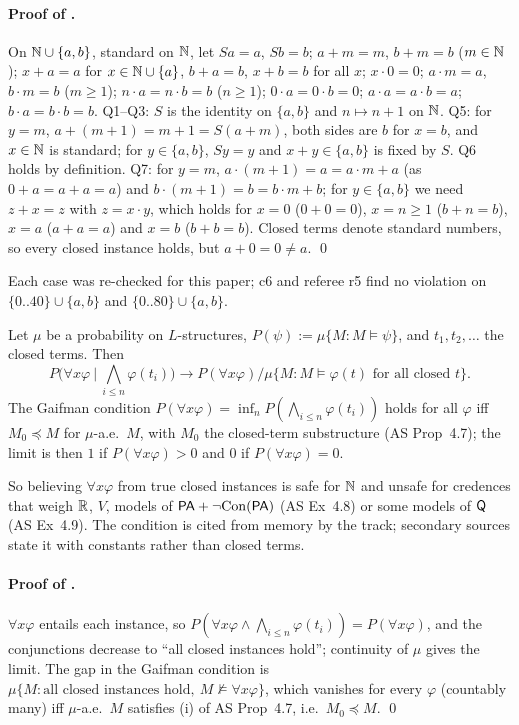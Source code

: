 \paragraph{Proof of .} On $\mathbb{N}\cup\{a,b\}$, standard on $\mathbb{N}$, let $Sa=a$, $Sb=b$; $a+m=m$, $b+m=b$ ($m\in\mathbb{N}$); $x+a=a$ for $x\in\mathbb{N}\cup\{a\}$, $b+a=b$, $x+b=b$ for all $x$; $x\cdot0=0$; $a\cdot m=a$, $b\cdot m=b$ ($m\ge1$); $n\cdot a=n\cdot b=b$ ($n\ge1$); $0\cdot a=0\cdot b=0$; $a\cdot a=a\cdot b=a$; $b\cdot a=b\cdot b=b$. Q1--Q3: $S$ is the identity on $\{a,b\}$ and $n\mapsto n+1$ on $\mathbb{N}$. Q5: for $y=m$, $a+(m+1)=m+1=S(a+m)$, both sides are $b$ for $x=b$, and $x\in\mathbb{N}$ is standard; for $y\in\{a,b\}$, $Sy=y$ and $x+y\in\{a,b\}$ is fixed by $S$. Q6 holds by definition. Q7: for $y=m$, $a\cdot(m+1)=a=a\cdot m+a$ (as $0+a=a+a=a$) and $b\cdot(m+1)=b=b\cdot m+b$; for $y\in\{a,b\}$ we need $z+x=z$ with $z=x\cdot y$, which holds for $x=0$ ($0+0=0$), $x=n\ge1$ ($b+n=b$), $x=a$ ($a+a=a$) and $x=b$ ($b+b=b$). Closed terms denote standard numbers, so every closed instance holds, but $a+0=0\neq a$. \qed

Each case was re-checked for this paper; c6 and referee r5 find no violation on $\{0..40\}\cup\{a,b\}$ and $\{0..80\}\cup\{a,b\}$.

\begin{proposition}\label{prop:univ:gaifman}
Let $\mu$ be a probability on $L$-structures, $P(\psi):=\mu\{M:M\models\psi\}$, and $t_1,t_2,\dots$ the closed terms. Then
\[P\Big(\forall x\varphi\ \Big|\ \textstyle\bigwedge_{i\le n}\varphi(t_i)\Big)\to P(\forall x\varphi)\big/\mu\{M:M\models\varphi(t)\text{ for all closed }t\}.\]
The Gaifman condition \citep{gaifman1964concerning} $P(\forall x\varphi)=\inf_nP(\bigwedge_{i\le n}\varphi(t_i))$ holds for all $\varphi$ iff $M_0\preccurlyeq M$ for $\mu$-a.e.\ $M$, with $M_0$ the closed-term substructure (AS Prop~4.7); the limit is then $1$ if $P(\forall x\varphi)>0$ and $0$ if $P(\forall x\varphi)=0$.
\end{proposition}

\noindent So believing $\forall x\varphi$ from true closed instances is safe for $\mathbb{N}$ and unsafe for credences that weigh $\mathbb{R}$, $V$, models of $\mathsf{PA}+\neg\mathrm{Con}(\mathsf{PA})$ (AS Ex~4.8) or some models of $\mathsf{Q}$ (AS Ex~4.9). The condition is cited from memory by the track; secondary sources state it with constants rather than closed terms.

\paragraph{Proof of .} $\forall x\varphi$ entails each instance, so $P(\forall x\varphi\wedge\bigwedge_{i\le n}\varphi(t_i))=P(\forall x\varphi)$, and the conjunctions decrease to ``all closed instances hold''; continuity of $\mu$ gives the limit. The gap in the Gaifman condition is $\mu\{M:\text{all closed instances hold},\ M\nvDash\forall x\varphi\}$, which vanishes for every $\varphi$ (countably many) iff $\mu$-a.e.\ $M$ satisfies (i) of AS Prop~4.7, i.e.\ $M_0\preccurlyeq M$. \qed

